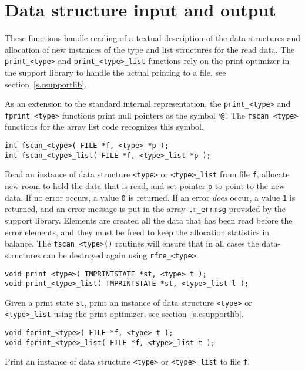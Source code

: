 \section{Data structure input and output}
These functions handle reading of a textual description of the data structures
and allocation of new instances of the type and list structures for the
read data.
The {\tt print\_<type>} and {\tt print\_<type>\_list} functions rely on the
print optimizer in the
{\C} support library to handle the actual printing to a file,
see section~\ref{s.csupportlib}.
\par
\begin{sloppypar}
As an extension to the standard {\Tm} internal representation,
the \verb!print_<type>! and \verb'fprint_<type>' functions print null
pointers as the symbol `{\tt @}'.
The \verb+fscan_<type>+ functions for the array list code recognizes
this symbol.
\end{sloppypar}
\begin{verbatim}
int fscan_<type>( FILE *f, <type> *p );
int fscan_<type>_list( FILE *f, <type>_list *p );
\end{verbatim}
\begin{desc}
Read an instance of data structure {\tt <type>} or {\tt <type>\_list}
from file {\tt f},
allocate new room to hold the data that is read,
and set pointer {\tt p} to point to the new data.
If no error occurs, a value {\tt 0} is returned.
If an error {\em does} occur,
a value {\tt 1} is returned, and an error message is put in the array
{\tt tm\_errmsg} provided by the {\C} support library.
Elements are created all the data that has been read before the error elements,
and they must be freed to keep the allocation statistics in balance.
The \verb+fscan_<type>()+ routines will ensure that in all cases the
data-structures can be destroyed again using \verb+rfre_<type>+.
\end{desc}
\begin{verbatim}
void print_<type>( TMPRINTSTATE *st, <type> t );
void print_<type>_list( TMPRINTSTATE *st, <type>_list l );
\end{verbatim}
\begin{desc}
Given a print state {\tt st},
print an instance of data structure {\tt <type>} or {\tt <type>\_list}
using the print optimizer, see section~\ref{s.csupportlib}.
\end{desc}
\begin{verbatim}
void fprint_<type>( FILE *f, <type> t );
void fprint_<type>_list( FILE *f, <type>_list t );
\end{verbatim}
\begin{desc}
Print an instance of data structure {\tt <type>} or {\tt <type>\_list}
to file {\tt f}.
\end{desc}
